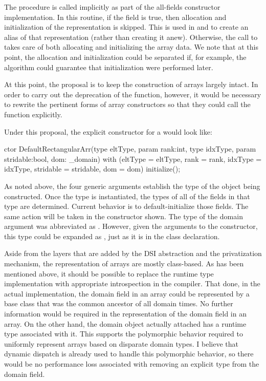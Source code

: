 The  procedure is called implicitly as part of the all-fields
constructor implementation.  In this routine, if the field  is true,
then allocation and initialization of the  representation is skipped.  This
is used in  and  to create an alias of that representation
(rather than creating it anew).  Otherwise, the call to  takes care
of both allocating and initializing the array data.  We note that at this point, the
allocation and initialization could be separated if, for example, the algorithm could
guarantee that initialization were performed later.

At this point, the proposal is to keep the construction of arrays largely intact.  In
order to carry out the deprecation of the  function, however, it would be
necessary to rewrite the pertinent forms of array constructors so that they could call the
 function explicitly.  

Under this proposal, the explicit constructor for a  would
look like:
\begin{chapel}
  ctor DefaultRectangularArr(type eltType, param rank:int, type idxType,
                             param stridable:bool, dom: _domain)
    with (eltType = eltType, rank = rank, idxType = idxType,
          stridable = stridable, dom = dom) {
      initialize();
    }
\end{chapel}
\noindent
As noted above, the four generic arguments establish the type of the object being
constructed.  Once the type is instantiated, the types of all of the fields in that type
are determined.  Current behavior is to default-initialize those fields.  The same action
will be taken in the constructor shown.  The type of the domain argument was abbreviated
as .  However, given the arguments to the constructor, this type could be
expanded as ,
just as it is in the class declaration.

Aside from the layers that are added by the DSI abstraction and the privatization
mechanism, the representation of arrays are mostly class-based.  As has been mentioned
above, it should be possible to replace the runtime type implementation with appropriate
introspection in the compiler.  That done, in the actual implementation, the domain field
in an array could be represented by a base class that was the common ancestor of all
domain times.  No further information would be required in the representation of the
domain field in an array.  On the other hand, the domain object actually attached has a
runtime type associated with it.  This supports the polymorphic behavior required to
uniformly represent arrays based on disparate domain types.  I believe that dynamic
dispatch is already used to handle this polymorphic behavior, so there would be no
performance loss associated with removing an explicit type from the domain field.

